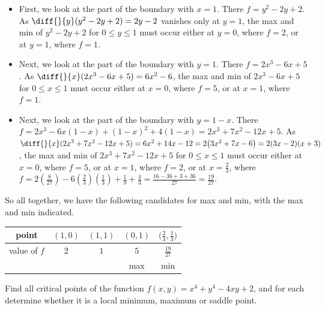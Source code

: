 \begin{solution}
\begin{itemize}
\item
First, we look at the part of the boundary with $x=1$. There $f=y^2-2y+2$.
As $\diff{}{y}(y^2-2y+2)=2y-2$ vanishes only at $y=1$, 
the max and min of $y^2-2y+2$ for $0\le y\le 1$ must occur either at $y=0$, 
where $f=2$, or at $y=1$, where $f=1$.

\item
Next, we look at the part of the boundary with $y=1$. There $f=2x^3-6x+5$.
As $\diff{}{x}(2x^3-6x+5)=6x^2-6$, 
the max and min of $2x^3-6x+5$ for $0\le x\le 1$ must occur either at $x=0$, 
where $f=5$, or at $x=1$, where $f=1$.

\item
Next, we look at the part of the boundary with $y=1-x$. There $f=2x^3-6x(1-x)
+(1-x)^2+4(1-x)=2x^3+7x^2-12x+5$.
As $\diff{}{x}(2x^3+7x^2-12x+5)=6x^2+14x-12
                               =2\big(3x^2+7x-6\big)
                               =2(3x-2)(x+3)$, 
the max and min of $2x^3+7x^2-12x+5$ for $0\le x\le 1$ must occur either at $x=0$, 
where $f=5$, or at $x=1$, where $f=2$, or at $x=\frac{2}{3}$, where $f=2(\frac{8}{27})-6(\frac{2}{3})(\frac{1}{3})+\frac{1}{9}+\frac{4}{3}
=\frac{16-36+3+36}{27}
=\frac{19}{27}$.
\end{itemize}
So all together, we have the following candidates for max and min, with the
max and min indicated.
\begin{center}
\renewcommand{\arraystretch}{1.3}
     \begin{tabular}{|c|c|c|c|c|}
     \hline
       point
       &$(1,0)$
       &$(1,1)$ 
       &$(0,1)$ 
       &$\big(\frac{2}{3},\frac{1}{3}\big)$ \\ \hline
       value of $f$
       &$2$
       &$1$
       &$5$
       &$\frac{19}{27}$\\ \hline
       & 
       & 
       & max
       & min\\ \hline
     \end{tabular}
\renewcommand{\arraystretch}{1.0}
\end{center}
\end{solution}

\begin{question}[M200 2003D] %
Find all critical points of the function $f(x,y)=x^4+y^4-4xy+2$, 
and for each determine whether it is a local minimum, maximum
or saddle point.
\end{question}

%

